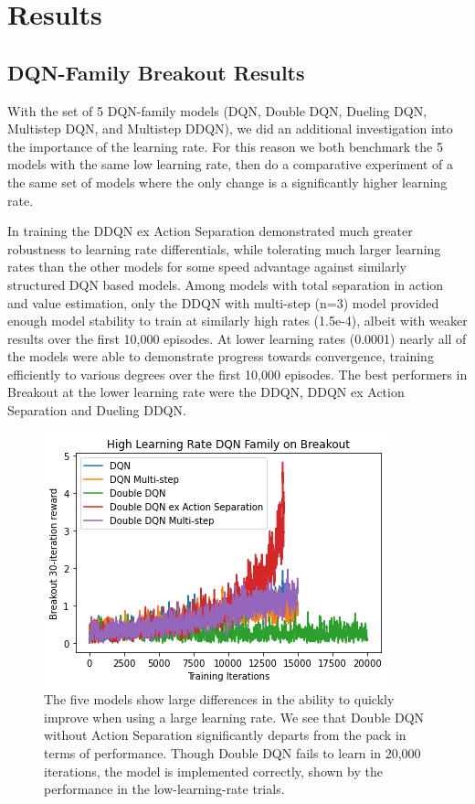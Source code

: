 \documentclass[conference]{IEEEtran}
\begin{document}
\section{Results} \label{results}

\subsection{DQN-Family Breakout Results}
With the set of 5 DQN-family models (DQN, Double DQN, Dueling DQN, Multistep DQN, and Multistep DDQN), we did an additional investigation into the importance of the learning rate. For this reason we both benchmark the 5 models with the same low learning rate, then do a comparative experiment of a the same set of models where the only change is a significantly higher learning rate.

In training the DDQN ex Action Separation demonstrated much greater robustness to learning rate differentials, while tolerating much larger learning rates than the other models for some speed advantage against similarly structured DQN based models.  Among models with total separation in action and value estimation, only the DDQN with multi-step (n=3) model provided enough model stability to train at similarly high rates (1.5e-4), albeit with weaker results over the first 10,000 episodes.  At lower learning rates (0.0001) nearly all of the models were able to demonstrate progress towards convergence, training efficiently to various degrees over the first 10,000 episodes.  The best performers in Breakout at the lower learning rate were the DDQN, DDQN ex Action Separation and Dueling DDQN.

\begin{figure}
\centerline{\includegraphics[scale=0.6]{DQNs_breakout_high_train.png}}
\caption{The five models show large differences in the ability to quickly improve when using a large learning rate. We see that Double DQN without Action Separation significantly departs from the pack in terms of performance. Though Double DQN fails to learn in 20,000 iterations, the model is implemented correctly, shown by the performance in the low-learning-rate trials.}
\end{figure}
\end{document}

